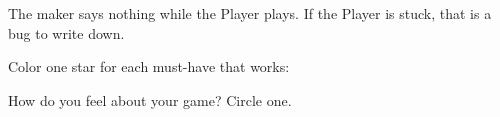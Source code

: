 \begin{grownup}
The maker says nothing while the Player plays. If the Player is stuck, that is a bug to write down.
\end{grownup}

\begin{vocab}
\end{vocab}

\begin{reflection}
Color one star for each must-have that works: \quad {\Large\faStar[regular]\ \faStar[regular]\ \faStar[regular]\ \faStar[regular]\ \faStar[regular]}

How do you feel about your game? Circle one.

\begin{center}
\Huge\faSmile[regular]\qquad\faMeh[regular]\qquad\faFrown[regular]
\end{center}
\end{reflection}
